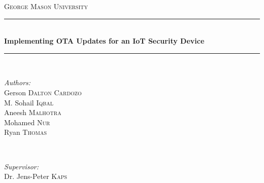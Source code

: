 \documentclass[11pt]{article}
\begin{document}
\begin{titlepage}

\newcommand{\HRule}{\rule{\linewidth}{0.5mm}} %

\center %
 

\textsc{\LARGE George Mason University}\\[1.5cm] %



\HRule \\[0.4cm]
{ \huge \bfseries Implementing OTA Updates for an IoT Security Device}\\[0.4cm] %
\HRule \\[1.5cm]
 
\begin{minipage}{0.4\textwidth}
\begin{flushleft} \large
\emph{Authors:}\\
Gerson \textsc{Dalton Cardozo} \\
M. Sohail \textsc{Iqbal} \\ 
Aneesh \textsc{Malhotra} \\ 
Mohamed \textsc{Nur} \\ 
Ryan \textsc{Thomas} %
\end{flushleft}
\end{minipage}
~
\begin{minipage}{0.4\textwidth}
\begin{flushright} \large
\emph{Supervisor:} \\
Dr. Jens-Peter \textsc{Kaps} %
\end{flushright}
\end{minipage}\\[2cm]



\end{titlepage}
\end{document}
